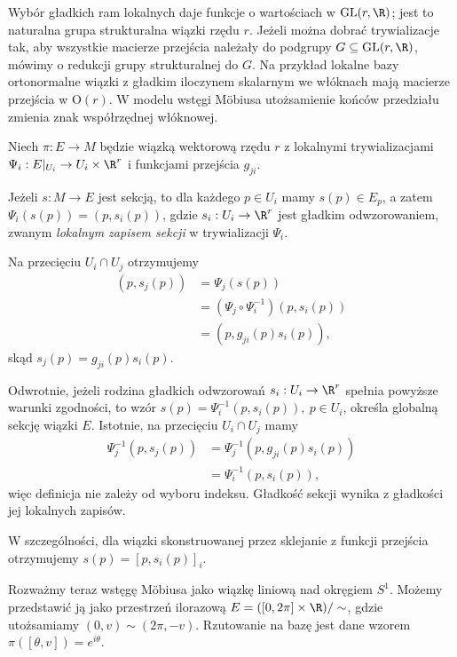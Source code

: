 \begin{uwaga}
Wybór gładkich ram lokalnych daje funkcje o wartościach w
$\mathrm{GL}(r,\R)$; jest to
naturalna grupa strukturalna wiązki rzędu $r$. Jeżeli można dobrać
trywializacje tak, aby wszystkie macierze przejścia należały do podgrupy
$G\subseteq\mathrm{GL}(r,\R)$, mówimy o redukcji grupy strukturalnej do $G$.
Na przykład lokalne bazy ortonormalne wiązki z gładkim iloczynem
skalarnym we włóknach mają macierze przejścia w $\mathrm{O}(r)$.
W modelu wstęgi Möbiusa utożsamienie końców przedziału
zmienia znak współrzędnej włóknowej.
\end{uwaga}


\begin{przyklad}
Niech $\pi:E\to M$ będzie wiązką wektorową rzędu $r$
z lokalnymi trywializacjami
$\Psi_i:E|_{U_i}\to U_i\times\R^r$ i funkcjami przejścia
$g_{ji}$.

Jeżeli $s:M\to E$ jest sekcją, to dla każdego $p\in U_i$
mamy $s(p)\in E_p$, a zatem $\Psi_i(s(p))=(p,s_i(p))$,
gdzie $s_i:U_i\to\R^r$ jest gładkim odwzorowaniem,
zwanym \emph{lokalnym zapisem sekcji} w trywializacji
$\Psi_i$.

Na przecięciu $U_i\cap U_j$ otrzymujemy
\[
\begin{aligned}
(p,s_j(p))
&=\Psi_j(s(p))\\
&=(\Psi_j\circ\Psi_i^{-1})(p,s_i(p))\\
&=(p,g_{ji}(p)s_i(p)),
\end{aligned}
\]
skąd $s_j(p)=g_{ji}(p)s_i(p)$.

Odwrotnie, jeżeli rodzina gładkich odwzorowań
$s_i:U_i\to\R^r$ spełnia powyższe warunki zgodności,
to wzór $s(p)=\Psi_i^{-1}(p,s_i(p)),\ p\in U_i$,
określa globalną sekcję wiązki $E$.
Istotnie, na przecięciu $U_i\cap U_j$ mamy
\[
\begin{aligned}
\Psi_j^{-1}(p,s_j(p))
&=\Psi_j^{-1}(p,g_{ji}(p)s_i(p))\\
&=\Psi_i^{-1}(p,s_i(p)),
\end{aligned}
\]
więc definicja nie zależy od wyboru indeksu.
Gładkość sekcji wynika z gładkości jej lokalnych
zapisów.

W szczególności, dla wiązki skonstruowanej przez
sklejanie z funkcji przejścia otrzymujemy $s(p)=[p,s_i(p)]_i$.

Rozważmy teraz wstęgę Möbiusa jako wiązkę liniową
nad okręgiem $S^1$. Możemy przedstawić ją jako
przestrzeń ilorazową $E=([0,2\pi]\times\R)/\sim$,
gdzie utożsamiamy $(0,v)\sim(2\pi,-v)$.
Rzutowanie na bazę jest dane wzorem $\pi([\theta,v])=e^{i\theta}$.


\end{przyklad}
